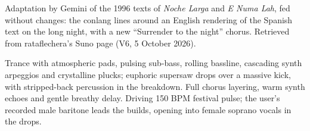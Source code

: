 
\begin{notes}
Adaptation by Gemini of the 1996 texts of \emph{Noche Larga} and \emph{E Numa Lah}, fed without changes: the conlang lines around an English rendering of the Spanish text on the long night, with a new ``Surrender to the night'' chorus. Retrieved from rataflechera's Suno page (V6, 5 October 2026).
\end{notes}
\begin{style}
Trance with atmospheric pads, pulsing sub-bass, rolling bassline, cascading synth arpeggios and crystalline plucks; euphoric supersaw drops over a massive kick, with stripped-back percussion in the breakdown. Full chorus layering, warm synth echoes and gentle breathy delay. Driving 150 BPM festival pulse; the user's recorded male baritone leads the builds, opening into female soprano vocals in the drops.
\end{style}
